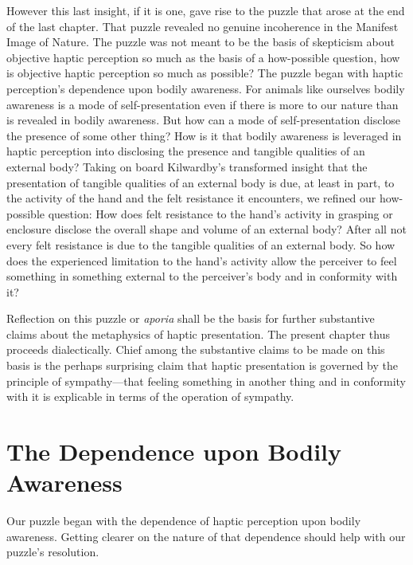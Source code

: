 However this last insight, if it is one, gave rise to the puzzle that arose at the end of the last chapter. That puzzle revealed no genuine incoherence in the Manifest Image of Nature. The puzzle was not meant to be the basis of skepticism about objective haptic perception so much as the basis of a how-possible question, how is objective haptic perception so much as possible? The puzzle began with haptic perception's dependence upon bodily awareness. For animals like ourselves bodily awareness is a mode of self-presentation even if there is more to our nature than is revealed in bodily awareness. But how can a mode of self-presentation disclose the presence of some other thing? How is it that bodily awareness is leveraged in haptic perception into disclosing the presence and tangible qualities of an external body? Taking on board Kilwardby's transformed insight that the presentation of tangible qualities of an external body is due, at least in part, to the activity of the hand and the felt resistance it encounters, we refined our how-possible question: How does felt resistance to the hand's activity in grasping or enclosure disclose the overall shape and volume of an external body? After all not every felt resistance is due to the tangible qualities of an external body. So how does the experienced limitation to the hand's activity allow the perceiver to feel something in something external to the perceiver's body and in conformity with it?

Reflection on this puzzle or \emph{aporia} shall be the basis for further substantive claims about the metaphysics of haptic presentation. The present chapter thus proceeds dialectically. Chief among the substantive claims to be made on this basis is the perhaps surprising claim that haptic presentation is governed by the principle of sympathy---that feeling something in another thing and in conformity with it is explicable in terms of the operation of sympathy. 


\section{The Dependence upon Bodily Awareness} %
\label{sec:the_dependence_of_haptic_perception_upon_bodily_awareness}

Our puzzle began with the dependence of haptic perception upon bodily awareness. Getting clearer on the nature of that dependence should help with our puzzle's resolution. 

